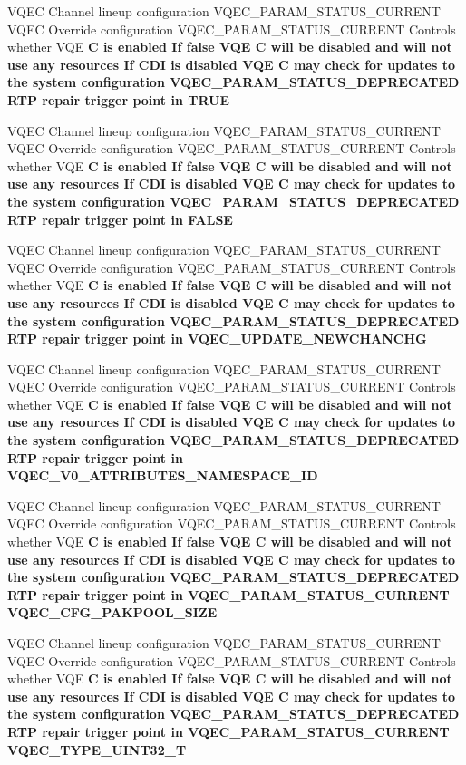 \begin{CompactItemize}
VQEC Channel lineup configuration VQEC\_\-PARAM\_\-STATUS\_\-CURRENT VQEC Override configuration VQEC\_\-PARAM\_\-STATUS\_\-CURRENT Controls whether VQE \bf{C} is enabled If false VQE \bf{C} will be disabled and will not use any resources If CDI is disabled VQE \bf{C} may check for updates \bf{to} the system configuration VQEC\_\-PARAM\_\-STATUS\_\-DEPRECATED RTP repair trigger point in \bf{TRUE}
\item 
VQEC Channel lineup configuration VQEC\_\-PARAM\_\-STATUS\_\-CURRENT VQEC Override configuration VQEC\_\-PARAM\_\-STATUS\_\-CURRENT Controls whether VQE \bf{C} is enabled If false VQE \bf{C} will be disabled and will not use any resources If CDI is disabled VQE \bf{C} may check for updates \bf{to} the system configuration VQEC\_\-PARAM\_\-STATUS\_\-DEPRECATED RTP repair trigger point in \bf{FALSE}
\item 
VQEC Channel lineup configuration VQEC\_\-PARAM\_\-STATUS\_\-CURRENT VQEC Override configuration VQEC\_\-PARAM\_\-STATUS\_\-CURRENT Controls whether VQE \bf{C} is enabled If false VQE \bf{C} will be disabled and will not use any resources If CDI is disabled VQE \bf{C} may check for updates \bf{to} the system configuration VQEC\_\-PARAM\_\-STATUS\_\-DEPRECATED RTP repair trigger point in \bf{VQEC\_\-UPDATE\_\-NEWCHANCHG}
\item 
VQEC Channel lineup configuration VQEC\_\-PARAM\_\-STATUS\_\-CURRENT VQEC Override configuration VQEC\_\-PARAM\_\-STATUS\_\-CURRENT Controls whether VQE \bf{C} is enabled If false VQE \bf{C} will be disabled and will not use any resources If CDI is disabled VQE \bf{C} may check for updates \bf{to} the system configuration VQEC\_\-PARAM\_\-STATUS\_\-DEPRECATED RTP repair trigger point in \bf{VQEC\_\-V0\_\-ATTRIBUTES\_\-NAMESPACE\_\-ID}
\item 
VQEC Channel lineup configuration VQEC\_\-PARAM\_\-STATUS\_\-CURRENT VQEC Override configuration VQEC\_\-PARAM\_\-STATUS\_\-CURRENT Controls whether VQE \bf{C} is enabled If false VQE \bf{C} will be disabled and will not use any resources If CDI is disabled VQE \bf{C} may check for updates \bf{to} the system configuration VQEC\_\-PARAM\_\-STATUS\_\-DEPRECATED RTP repair trigger point in VQEC\_\-PARAM\_\-STATUS\_\-CURRENT \bf{VQEC\_\-CFG\_\-PAKPOOL\_\-SIZE}
\item 
VQEC Channel lineup configuration VQEC\_\-PARAM\_\-STATUS\_\-CURRENT VQEC Override configuration VQEC\_\-PARAM\_\-STATUS\_\-CURRENT Controls whether VQE \bf{C} is enabled If false VQE \bf{C} will be disabled and will not use any resources If CDI is disabled VQE \bf{C} may check for updates \bf{to} the system configuration VQEC\_\-PARAM\_\-STATUS\_\-DEPRECATED RTP repair trigger point in VQEC\_\-PARAM\_\-STATUS\_\-CURRENT \bf{VQEC\_\-TYPE\_\-UINT32\_\-T}

\end{CompactItemize}
